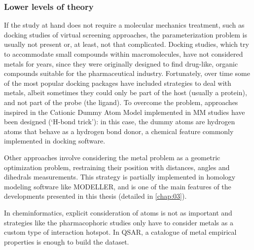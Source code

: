 \subsubsection{Lower levels of theory}
If the study at hand does not require a molecular mechanics treatment, such as docking studies of virtual screening approaches, the parameterization problem is usually not present or, at least, not that complicated. Docking studies, which try to accommodate small compounds within macromolecules, have not considered metals for years, since they were originally designed to find drug-like, organic compounds suitable for the pharmaceutical industry. Fortunately, over time some of the most popular docking packages have included strategies to deal with metals,\cite{flexx} albeit sometimes they could only be part of the host (usually a protein), and not part of the probe (the ligand).\cite{verdonk2003improved} To overcome the problem, approaches inspired in the Cationic Dummy Atom Model implemented in MM studies have been designed (‘H-bond trick’): in this case, the dummy atoms are hydrogen atoms that behave as a hydrogen bond donor, a chemical feature commonly implemented in docking software.

Other approaches involve considering the metal problem as a geometric optimization problem, restraining their position with distances, angles and dihedrals measurements. This strategy is partially implemented in homology modeling software like MODELLER, \cite{Sali1993} and is one of the main features of the developments presented in this thesis (detailed in \autoref{chap:03}).

In cheminformatics, explicit consideration of atoms is not as important and strategies like the pharmacophoric studies only have to consider metals as a custom type of interaction hotspot.\cite{johns2009,kawasuji2012,carcelli2014,yang2016} In QSAR, a catalogue of metal empirical properties is enough to build the dataset.\cite{walker2012fundamental}

